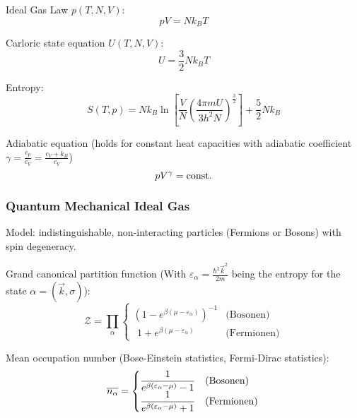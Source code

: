 			\noindent
			Ideal Gas Law $p(T, N, V)$:
			\begin{equation}
				pV = N k_B T
			\end{equation}

			\noindent
			Carloric state equation $U(T, N, V)$:
			\begin{equation}
				U = \frac{3}{2} N k_B T
			\end{equation}

			\noindent
			Entropy:
			\begin{equation}
				S(T,p) = N k_B \ln{\left[ \frac{V}{N}\left( \frac{4\pi m	U}{3 h^2 N} \right)^{\frac{3}{2}} \right]} + \frac{5}{2} N k_B
			\end{equation}

			\noindent
			Adiabatic equation (holds for constant heat capacities with adiabatic coefficient $\gamma = \frac{c_p}{c_V} = \frac{c_V + k_B}{c_V}$)
			\begin{equation}
				p V^\gamma = \mathrm{const.}
			\end{equation}

		\subsubsection{Quantum Mechanical Ideal Gas}
			\noindent
			Model: indistinguishable, non-interacting particles (Fermions or Bosons) with spin degeneracy. \vsp

			\noindent
			Grand canonical partition function (With $\varepsilon_\alpha = \frac{\hbar^2 \vec{k}^2}{2m}$ being the entropy for the state $\alpha=(\vec{k},\sigma)$):
			\begin{equation}
				\mathcal{Z} = \prod_{\alpha}
					\begin{cases}
						\left( 1-e^{\beta(\mu-\varepsilon_\alpha)}\right)^{-1} & \text{(Bosonen)} \\
						\phantom{\big(} 1+e^{\beta(\mu-\varepsilon_\alpha)} & \text{(Fermionen)}
					\end{cases}
			\end{equation}

			\noindent
			Mean occupation number (Bose-Einstein statistics, Fermi-Dirac statistics):
			\begin{equation}
				\overline{n_\alpha} =
					\begin{cases}
						\dfrac{1}{e^{\beta(\varepsilon_\alpha-\mu)} - 1} & \text{(Bosonen)} \\
						\dfrac{1}{e^{\beta(\varepsilon_\alpha-\mu)} + 1} & \text{(Fermionen)}
					\end{cases} \\
			\end{equation}

